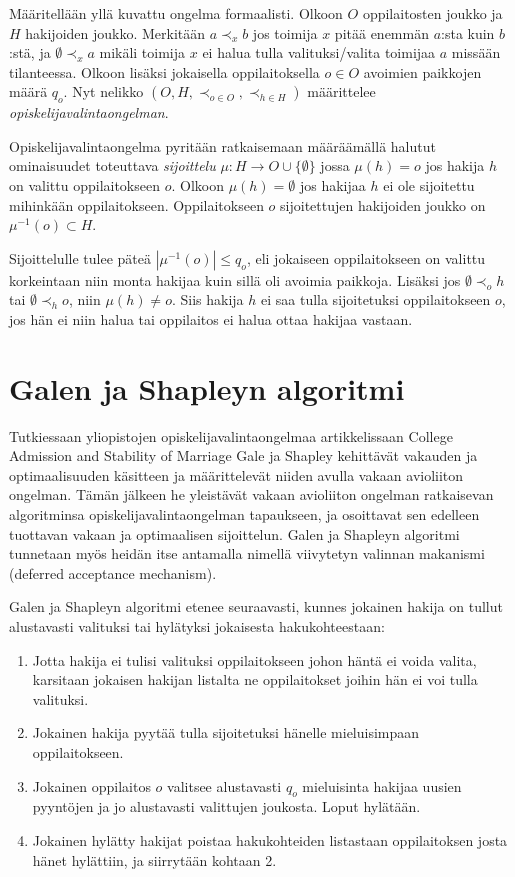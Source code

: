 \documentclass[gradu, twoside]{tktltiki}
\begin{document}
Määritellään yllä kuvattu ongelma formaalisti. Olkoon $O$
oppilaitosten joukko ja $H$ hakijoiden joukko. Merkitään $a \prec_x b$
jos toimija $x$ pitää enemmän $a$:sta kuin $b$:stä, ja $\emptyset
\prec_x a$ mikäli toimija $x$ ei halua tulla valituksi/valita toimijaa
$a$ missään tilanteessa. Olkoon lisäksi jokaisella oppilaitoksella $o
\in O$ avoimien paikkojen määrä $q_o$. Nyt nelikko $(O, H, \prec_{o \in O},
\prec_{h \in H})$ määrittelee \emph{opiskelijavalintaongelman}.

Opiskelijavalintaongelma pyritään ratkaisemaan määräämällä halutut
ominaisuudet toteuttava \emph{sijoittelu} $\mu : H \rightarrow O \cup
\{\emptyset\}$ jossa $\mu(h) = o$ jos hakija $h$ on valittu
oppilaitokseen $o$. Olkoon $\mu(h) = \emptyset$ jos hakijaa $h$ ei ole
sijoitettu mihinkään oppilaitokseen. Oppilaitokseen $o$ sijoitettujen
hakijoiden joukko on $\mu^{-1}(o) \subset H$.

Sijoittelulle tulee päteä $|\mu^{-1}(o)| \leq q_o$, eli jokaiseen
oppilaitokseen on valittu korkeintaan niin monta hakijaa kuin sillä
oli avoimia paikkoja. Lisäksi jos $\emptyset \prec_o h$ tai $\emptyset
\prec_h o$, niin $\mu(h) \neq o$. Siis hakija $h$ ei saa tulla
sijoitetuksi oppilaitokseen $o$, jos hän ei niin halua tai oppilaitos
ei halua ottaa hakijaa vastaan.

\section{Galen ja Shapleyn algoritmi}

Tutkiessaan yliopistojen opiskelijavalintaongelmaa artikkelissaan
College Admission and Stability of Marriage Gale ja Shapley kehittävät
vakauden ja optimaalisuuden käsitteen ja määrittelevät niiden avulla
vakaan avioliiton ongelman. Tämän jälkeen he yleistävät vakaan
avioliiton ongelman ratkaisevan algoritminsa opiskelijavalintaongelman
tapaukseen, ja osoittavat sen edelleen tuottavan vakaan ja
optimaalisen sijoittelun. Galen ja Shapleyn algoritmi tunnetaan myös
heidän itse antamalla nimellä viivytetyn valinnan makanismi (deferred
acceptance mechanism). \cite{galeshapley62}

Galen ja Shapleyn algoritmi etenee seuraavasti, kunnes jokainen hakija
on tullut alustavasti valituksi tai hylätyksi jokaisesta
hakukohteestaan:

\begin{enumerate}
\item Jotta hakija ei tulisi valituksi oppilaitokseen johon häntä ei
  voida valita, karsitaan jokaisen hakijan listalta ne oppilaitokset
  joihin hän ei voi tulla valituksi.

\item Jokainen hakija pyytää tulla sijoitetuksi hänelle mieluisimpaan
  oppilaitokseen.

\item Jokainen oppilaitos $o$ valitsee alustavasti $q_o$ mieluisinta
  hakijaa uusien pyyntöjen ja jo alustavasti valittujen joukosta.
  Loput hylätään.

\item Jokainen hylätty hakijat poistaa hakukohteiden listastaan
  oppilaitoksen josta hänet hylättiin, ja siirrytään kohtaan 2.
\end{enumerate}
\end{document}
